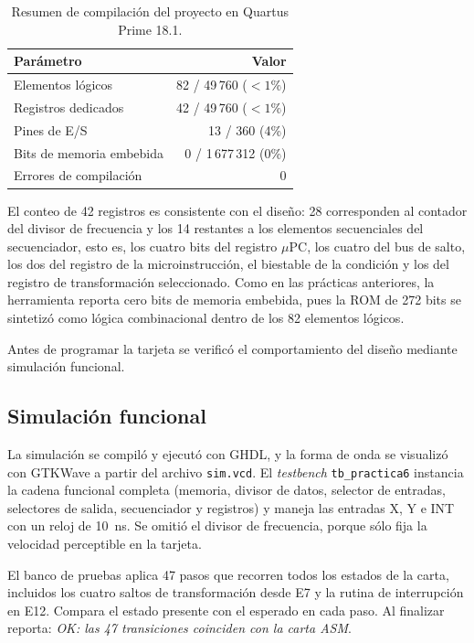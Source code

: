 \begin{table}[H]
  \centering
  \caption{Resumen de compilación del proyecto en Quartus Prime 18.1.}
  \label{tab:sintesis}
  \begin{tabular}{@{}l r@{}}
    \toprule
    \textbf{Parámetro} & \textbf{Valor} \\
    \midrule
    Elementos lógicos            & 82 / 49\,760 ($<1\%$) \\
    Registros dedicados          & 42 / 49\,760 ($<1\%$) \\
    Pines de E/S                 & 13 / 360 (4\%) \\
    Bits de memoria embebida     & 0 / 1\,677\,312 (0\%) \\
    Errores de compilación       & 0 \\
    \bottomrule
  \end{tabular}
\end{table}

El conteo de 42 registros es consistente con el diseño: 28 corresponden al contador del
divisor de frecuencia y los 14 restantes a los elementos secuenciales del secuenciador, esto
es, los cuatro bits del registro $\mu$PC, los cuatro del bus de salto, los dos del registro de
la microinstrucción, el biestable de la condición y los del registro de transformación
seleccionado. Como en las prácticas anteriores, la herramienta reporta cero bits de memoria
embebida, pues la ROM de 272 bits se sintetizó como lógica combinacional dentro de los 82
elementos lógicos.

Antes de programar la tarjeta se verificó el comportamiento del diseño mediante simulación
funcional.

\subsection{Simulación funcional}

La simulación se compiló y ejecutó con GHDL, y la forma de onda se visualizó con GTKWave a partir del
archivo \texttt{sim.vcd}. El \textit{testbench} \texttt{tb\_practica6} instancia la cadena funcional
completa (memoria, divisor de datos, selector de entradas, selectores de salida, secuenciador y
registros) y maneja las entradas X, Y e INT con un reloj de 10~ns. Se omitió el divisor de frecuencia,
porque sólo fija la velocidad perceptible en la tarjeta.

El banco de pruebas aplica 47 pasos que recorren todos los estados de la carta, incluidos los cuatro
saltos de transformación desde E7 y la rutina de interrupción en E12. Compara el estado presente
con el esperado en cada paso. Al finalizar reporta: \textit{OK: las 47 transiciones coinciden con la
carta ASM}.

